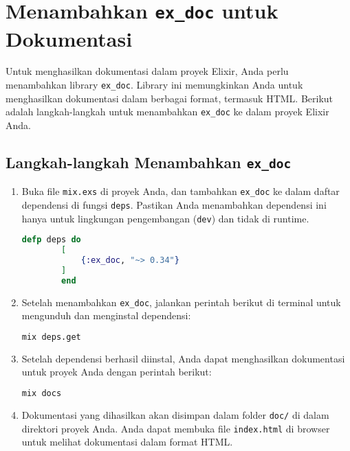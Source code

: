 \section{Menambahkan \texttt{ex\_doc} untuk Dokumentasi}

Untuk menghasilkan dokumentasi dalam proyek Elixir, Anda perlu menambahkan library \texttt{ex\_doc}. Library ini memungkinkan Anda untuk menghasilkan dokumentasi dalam berbagai format, termasuk HTML. Berikut adalah langkah-langkah untuk menambahkan \texttt{ex\_doc} ke dalam proyek Elixir Anda.

\subsection{Langkah-langkah Menambahkan \texttt{ex\_doc}}

\begin{enumerate}
	\item Buka file \texttt{mix.exs} di proyek Anda, dan tambahkan \texttt{ex\_doc} ke dalam daftar dependensi di fungsi \texttt{deps}. Pastikan Anda menambahkan dependensi ini hanya untuk lingkungan pengembangan (\texttt{dev}) dan tidak di runtime.
	
	\begin{lstlisting}[language=Elixir]
		defp deps do
		[
			{:ex_doc, "~> 0.34"}
		]
		end
	\end{lstlisting}
	
	\item Setelah menambahkan \texttt{ex\_doc}, jalankan perintah berikut di terminal untuk mengunduh dan menginstal dependensi:
	
	\begin{lstlisting}[language=Bash]
		mix deps.get
	\end{lstlisting}
	
	\item Setelah dependensi berhasil diinstal, Anda dapat menghasilkan dokumentasi untuk proyek Anda dengan perintah berikut:
	
	\begin{lstlisting}[language=Bash]
		mix docs
	\end{lstlisting}
	
	\item Dokumentasi yang dihasilkan akan disimpan dalam folder \texttt{doc/} di dalam direktori proyek Anda. Anda dapat membuka file \texttt{index.html} di browser untuk melihat dokumentasi dalam format HTML.
\end{enumerate}




